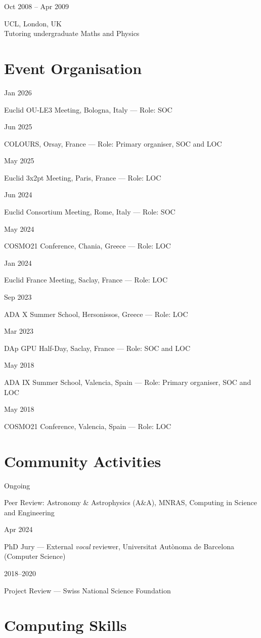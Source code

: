 \documentclass[a4paper,10pt]{article}
\newlength{\cvdatew}
\newcommand{\cvline}[2]{%
  \vspace{2pt}%
  \noindent\begin{minipage}[t]{\cvdatew}%
    \raggedright\small\color{muted}#1%
  \end{minipage}%
  \hspace{0.6em}%
  \begin{minipage}[t]{\dimexpr\linewidth-\cvdatew-0.6em\relax}%
    #2%
  \end{minipage}%
  \vspace{2pt}%
}
\begin{document}
\cvline{Oct 2008 -- Apr 2009}{UCL, London, UK\\
  {\small\color{muted}Tutoring undergraduate Maths and Physics}}

\section{Event Organisation}

\cvline{Jan 2026}{Euclid OU-LE3 Meeting, Bologna, Italy --- {\small\color{muted}Role: SOC}}
\cvline{Jun 2025}{COLOURS, Orsay, France --- {\small\color{muted}Role: Primary organiser, SOC and LOC}}
\cvline{May 2025}{Euclid 3x2pt Meeting, Paris, France --- {\small\color{muted}Role: LOC}}
\cvline{Jun 2024}{Euclid Consortium Meeting, Rome, Italy --- {\small\color{muted}Role: SOC}}
\cvline{May 2024}{COSMO21 Conference, Chania, Greece --- {\small\color{muted}Role: LOC}}
\cvline{Jan 2024}{Euclid France Meeting, Saclay, France --- {\small\color{muted}Role: LOC}}
\cvline{Sep 2023}{ADA X Summer School, Hersonissos, Greece --- {\small\color{muted}Role: LOC}}
\cvline{Mar 2023}{DAp GPU Half-Day, Saclay, France --- {\small\color{muted}Role: SOC and LOC}}
\cvline{May 2018}{ADA IX Summer School, Valencia, Spain --- {\small\color{muted}Role: Primary organiser, SOC and LOC}}
\cvline{May 2018}{COSMO21 Conference, Valencia, Spain --- {\small\color{muted}Role: LOC}}

\section{Community Activities}

\cvline{Ongoing}{Peer Review: Astronomy \& Astrophysics (A\&A), MNRAS, Computing in Science and Engineering}
\cvline{Apr 2024}{PhD Jury --- External \textit{vocal} reviewer, Universitat Aut\`onoma de Barcelona (Computer Science)}
\cvline{2018--2020}{Project Review --- Swiss National Science Foundation}

\section{Computing Skills}
\end{document}
